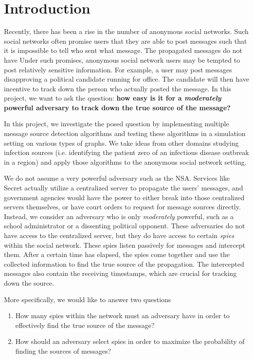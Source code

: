 \section{Introduction}

Recently, there has been a rise in the number of anonymous social networks. Such social networks  often promise users that they are able to post messages such that it is impossible to tell who sent what message. The propagated messages do not have 
Under such promises, anonymous social network users may be tempted to post relatively sensitive information. For example, a user may post messages disapproving a political candidate running for office. The candidate will then have incentive to track down the person who actually posted the message. In this project, we want to ask the question: \textbf{how easy is it for a \emph{moderately} powerful adversary to track down the true source of the message?}

In this project, we investigate the posed question by implementing multiple message source detection algorithms and testing these algorithms in a simulation setting on various types of graphs. We take ideas from other domains studying infection sources (i.e. identifying the patient zero of an infectious disease outbreak in a region) and apply those algorithms to the anonymous social network setting. 

We do not assume a very powerful adversary such as the NSA. Services like Secret actually utilize a centralized server to propagate the users' messages, and government agencies would have the power to either break into those centralized servers themselves, or have court orders to request for message sources directly. Instead, we consider an adversary who is only \emph{moderately} powerful, such as a school administrator or a dissenting political opponent. These adversaries do not have access to the centralized server, but they do have access to certain \emph{spies} within the social network. These spies listen passively for messages and intercept them. After a certain time has elapsed, the spies come together and use the collected information to find the true source of the propagation. The intercepted messages also contain the receiving timestamps, which are crucial for tracking down the source.

More specifically, we would like to answer two questions
\begin{enumerate}
\item How many spies within the network must an adversary have in order to effectively find the true source of the message?
\item How should an adversary select spies in order to maximize the probability of finding the sources of messages? 
\end{enumerate}

